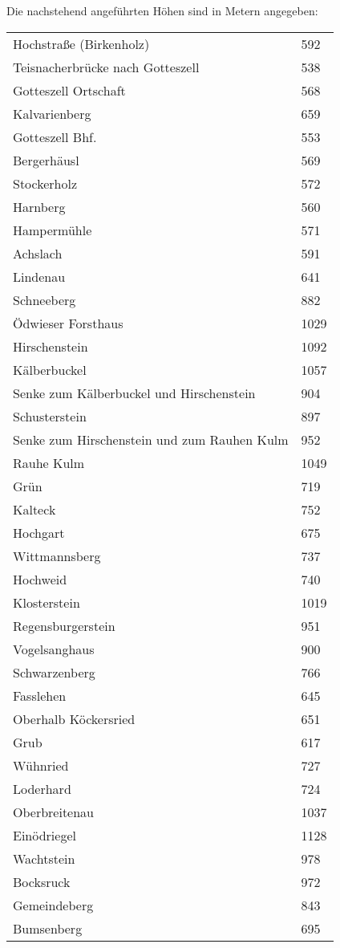 \documentclass[12pt,a4paper]{book}
\begin{document}
Die nachstehend angeführten Höhen sind in Metern angegeben:

\begin{longtable}{ll}
Hochstraße (Birkenholz) & 592 \\
Teisnacherbrücke nach Gotteszell & 538 \\
Gotteszell Ortschaft & 568 \\
Kalvarienberg & 659 \\
Gotteszell Bhf. & 553 \\
Bergerhäusl & 569 \\
Stockerholz & 572 \\
Harnberg & 560 \\
Hampermühle & 571 \\
Achslach & 591 \\
Lindenau & 641 \\
Schneeberg & 882 \\
Ödwieser Forsthaus & 1029 \\
Hirschenstein & 1092 \\
Kälberbuckel & 1057 \\
Senke zum Kälberbuckel und Hirschenstein & 904 \\
Schusterstein & 897 \\
Senke zum Hirschenstein und zum Rauhen Kulm & 952 \\
Rauhe Kulm & 1049 \\
Grün & 719 \\
Kalteck & 752 \\
Hochgart & 675 \\
Wittmannsberg & 737 \\
Hochweid & 740 \\
Klosterstein & 1019 \\
Regensburgerstein & 951 \\
Vogelsanghaus & 900 \\
Schwarzenberg & 766 \\
Fasslehen & 645 \\
Oberhalb Köckersried & 651 \\
Grub & 617 \\
Wühnried & 727 \\
Loderhard & 724 \\
Oberbreitenau & 1037 \\
Einödriegel & 1128 \\
Wachtstein & 978 \\
Bocksruck & 972 \\
Gemeindeberg & 843 \\
Bumsenberg & 695 \\

\end{longtable}
\end{document}
